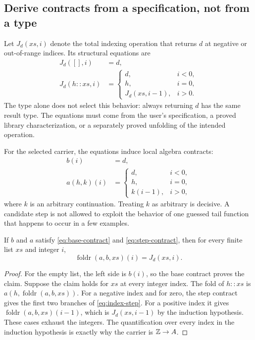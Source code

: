\subsection{Derive contracts from a specification, not from a type}

Let $J_d(xs,i)$ denote the total indexing operation that returns $d$ at negative
or out-of-range indices. Its structural equations are
\begin{align}
 J_d([],i)&=d,\label{eq:index-base}\\
 J_d(h::xs,i)&=
 \begin{cases}
 d,&i<0,\\
 h,&i=0,\\
 J_d(xs,i-1),&i>0.
 \end{cases}\label{eq:index-step}
\end{align}
The type alone does not select this behavior: always returning $d$ has the same
result type. The equations must come from the user's specification, a proved
library characterization, or a separately proved unfolding of the intended
operation.

For the selected carrier, the equations induce local algebra contracts:
\begin{align}
 b(i)&=d,\label{eq:base-contract}\\
 a(h,k)(i)&=
 \begin{cases}
 d,&i<0,\\
 h,&i=0,\\
 k(i-1),&i>0,
 \end{cases}\label{eq:step-contract}
\end{align}
where $k$ is an arbitrary continuation. Treating $k$ as arbitrary is decisive.
A candidate step is not allowed to exploit the behavior of one guessed tail
function that happens to occur in a few examples.

\begin{theorem}\label{thm:fold}
If $b$ and $a$ satisfy \eqref{eq:base-contract} and
\eqref{eq:step-contract}, then for every finite list $xs$ and integer $i$,
\[
 \operatorname{foldr}(a,b,xs)(i)=J_d(xs,i).
\]
\end{theorem}
\begin{proof}
For the empty list, the left side is $b(i)$, so the base contract proves the
claim. Suppose the claim holds for $xs$ at every integer index. The fold of
$h::xs$ is $a(h,\operatorname{foldr}(a,b,xs))$. For a negative index and for zero,
the step contract gives the first two branches of \eqref{eq:index-step}.
For a positive index it gives
$\operatorname{foldr}(a,b,xs)(i-1)$, which is $J_d(xs,i-1)$ by the induction
hypothesis. These cases exhaust the integers. The quantification over every
index in the induction hypothesis is exactly why the carrier is $\mathbb{Z}\to A$.
\end{proof}

